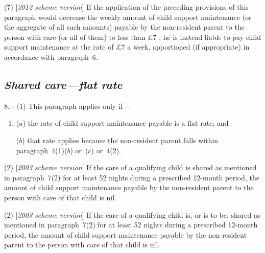 \documentclass[12pt,a4paper]{article}
\begin{document}
(7) [\emph{2012 scheme version}] If the application of the preceding provisions of this paragraph would decrease the weekly amount of child support maintenance (or the aggregate of all such amounts) payable by the non-resident parent to the person with care (or all of them) to less than 
£7%
, he is instead liable to pay child support maintenance at the rate of 
£7  %
a week, apportioned (if appropriate) in accordance with paragraph~6. 


\subsection*{\itshape Shared care—flat rate}

8.---(1) This paragraph applies only if—
\begin{enumerate}\item[]
($a$) the rate of child support maintenance payable is a flat rate; and

($b$) that rate applies because the non-resident parent falls within paragraph~4(1)($b$)  or~($c$)  or~4(2).
\end{enumerate}

(2) [\emph{2003 scheme version}] If the care of a qualifying child is shared as mentioned in paragraph~7(2)  for at least 52 nights during a prescribed 12-month period, the amount of child support maintenance payable by the non-resident parent to the person with care of that child is nil.

(2) [\emph{2003 scheme version}] 
If the care of a qualifying child is, or is to be, shared  %
as mentioned in paragraph~7(2)  for at least 52 nights during a prescribed 12-month period, the amount of child support maintenance payable by the non-resident parent to the person with care of that child is nil.
\end{document}
